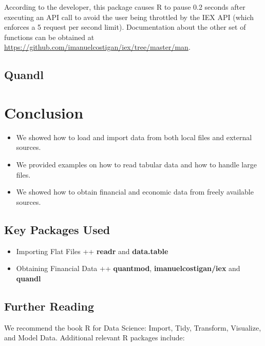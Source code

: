 \documentclass[]{book}
\providecommand{\tightlist}{%
  \setlength{\itemsep}{0pt}\setlength{\parskip}{0pt}}
\theoremstyle{definition}
\theoremstyle{definition}
\theoremstyle{definition}
\theoremstyle{remark}
\begin{document}
According to the developer, this package causes R to pause 0.2 seconds
after executing an API call to avoid the user being throttled by the IEX
API (which enforces a 5 request per second limit). Documentation about
the other set of functions can be obtained at
\url{https://github.com/imanuelcostigan/iex/tree/master/man}.

\subsection{Quandl}\label{quandl}

\section{Conclusion}\label{conclusion}

\begin{itemize}
\tightlist
\item
  We showed how to load and import data from both local files and
  external sources.
\item
  We provided examples on how to read tabular data and how to handle
  large files.
\item
  We showed how to obtain financial and economic data from freely
  available sources.
\end{itemize}

\subsection{Key Packages Used}\label{key-packages-used}

\begin{itemize}
\item
  Importing Flat Files ++ \textbf{readr} and \textbf{data.table}
\item
  Obtaining Financial Data ++ \textbf{quantmod},
  \textbf{imanuelcostigan/iex} and \textbf{quandl}
\end{itemize}

\subsection{Further Reading}\label{further-reading}

We recommend the book R for Data Science: Import, Tidy, Transform,
Visualize, and Model Data. Additional relevant R packages include:
\end{document}
